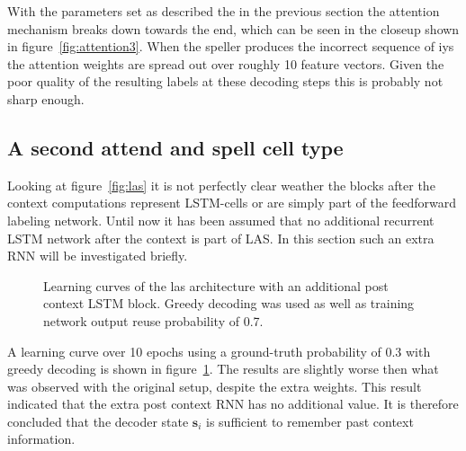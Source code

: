 With the parameters set as described the in the previous section the attention mechanism breaks down towards the end, which can be seen in the closeup shown in figure~\ref{fig:attention3}. When the speller produces the incorrect sequence of iys the attention weights are spread out over roughly 10 feature vectors. Given the poor quality of the resulting labels at these decoding steps this is probably not sharp enough.


\subsection{A second attend and spell cell type}
Looking at figure~\ref{fig:las} it is not perfectly clear weather the blocks after the context computations represent LSTM-cells or are simply part of the feedforward labeling network. Until now it has been assumed that no additional recurrent LSTM network after the context is part of LAS. In this section such an extra RNN will be investigated briefly. 
\begin{figure}
%


\caption{Learning curves of the las architecture with an additional post context LSTM block. Greedy decoding was used as well as training network output reuse probability of 0.7.}
\label{fig:variantResult}
\end{figure}
A learning curve over 10 epochs using a ground-truth probability of 0.3 with greedy decoding is shown in figure~\ref{fig:variantResult}. The results are slightly worse then what was observed with the original setup, despite the extra weights. This result indicated that the extra post context RNN has no additional value.
It is therefore concluded that the decoder state $\mathbf{s}_i$ is sufficient to remember past context information.



